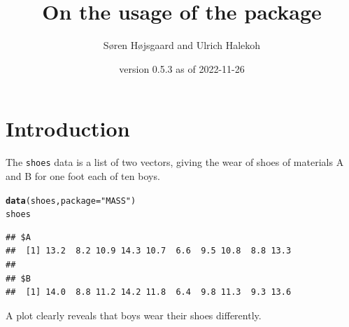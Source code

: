 \documentclass[11pt]{article}\usepackage[]{graphicx}\usepackage[]{xcolor}
\title{On the usage of the  \pkg{pbkrtest} package}
\author{S{\o}ren H{\o}jsgaard and Ulrich Halekoh}
\date{\pkg{pbkrtest} version 0.5.3 as of 2022-11-26}
\makeatletter
\newcommand{\hlstr}[1]{\textcolor[rgb]{0.192,0.494,0.8}{#1}}%
\newcommand{\hlstd}[1]{\textcolor[rgb]{0.345,0.345,0.345}{#1}}%
\newcommand{\hlkwc}[1]{\textcolor[rgb]{0.333,0.667,0.333}{#1}}%
\newcommand{\hlkwd}[1]{\textcolor[rgb]{0.737,0.353,0.396}{\textbf{#1}}}%
\newenvironment{kframe}{%
 \def\at@end@of@kframe{}%
 \ifinner\ifhmode%
  \def\at@end@of@kframe{\end{minipage}}%
  \begin{minipage}{\columnwidth}%
 \fi\fi%
 \def\FrameCommand##1{\hskip\@totalleftmargin \hskip-\fboxsep
 \colorbox{shadecolor}{##1}\hskip-\fboxsep
     \hskip-\linewidth \hskip-\@totalleftmargin \hskip\columnwidth}%
 \MakeFramed {\advance\hsize-\width
   \@totalleftmargin\z@ \linewidth\hsize
   \@setminipage}}%
 {\par\unskip\endMakeFramed%
 \at@end@of@kframe}
\newenvironment{knitrout}{}{} %
\def\code#1{{\texttt{#1}}}
\makeatother
\begin{document}





\maketitle
\tableofcontents




\section{Introduction}

The \code{shoes} data is a list of two vectors, giving the wear of
shoes of materials A and B for one foot each of ten boys.

\begin{knitrout}
\color{fgcolor}\begin{kframe}
\begin{alltt}
\hlkwd{data}\hlstd{(shoes,} \hlkwc{package}\hlstd{=}\hlstr{"MASS"}\hlstd{)}
\hlstd{shoes}
\end{alltt}
\begin{verbatim}
## $A
##  [1] 13.2  8.2 10.9 14.3 10.7  6.6  9.5 10.8  8.8 13.3
## 
## $B
##  [1] 14.0  8.8 11.2 14.2 11.8  6.4  9.8 11.3  9.3 13.6
\end{verbatim}
\end{kframe}
\end{knitrout}

A plot clearly reveals that boys wear their shoes differently.
\end{document}
